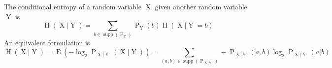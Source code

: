 The conditional entropy of a random variable $\operatorname{X}$ given another random variable $\operatorname{Y}$ is
$$\operatorname{H}(\operatorname{X} | \operatorname{Y}) = \sum\limits_{b \in \operatorname{supp}(\operatorname{P}_{\operatorname{Y}})} \operatorname{P}_{\operatorname{Y}}(b) \operatorname{H}(\operatorname{X} | \operatorname{Y} = b)$$
An equivalent formulation is
$$\operatorname{H}(\operatorname{X} | \operatorname{Y}) = \operatorname{E}(- \log_{2} \operatorname{P}_{\operatorname{X} | \operatorname{Y}}(\operatorname{X} | \operatorname{Y})) = \sum\limits_{(a,b) \in \operatorname{supp}(\operatorname{P}_{\operatorname{X}\operatorname{Y}})} -\operatorname{P}_{\operatorname{X}\operatorname{Y}}(a, b) \log_{2} \operatorname{P}_{\operatorname{X} | \operatorname{Y}}(a | b)$$
